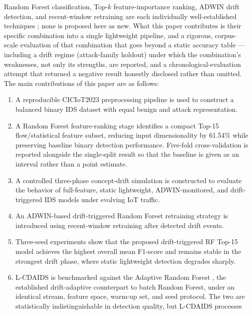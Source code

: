 \documentclass[11pt,a4paper]{article}
\begin{document}
Random Forest classification, Top-$k$ feature-importance ranking, ADWIN
drift detection, and recent-window retraining are each individually
well-established techniques \cite{breiman2001,guyon2003,bifet2007}; none is
proposed here as new. What this paper contributes is their specific
combination into a single lightweight pipeline, and a rigorous,
corpus-scale evaluation of that combination that goes beyond a static
accuracy table --- including a drift regime (attack-family holdout) under
which the combination's weaknesses, not only its strengths, are reported,
and a chronological-evaluation attempt that returned a negative result
honestly disclosed rather than omitted. The main contributions of this
paper are as follows:

\begin{enumerate}
  \item A reproducible CICIoT2023 preprocessing pipeline is used to
        construct a balanced binary IDS dataset with equal benign and
        attack representation.
  \item A Random Forest feature-ranking stage identifies a compact
        Top-15 flow/statistical feature subset, reducing input
        dimensionality by 61.54\% while preserving baseline binary
        detection performance. Five-fold cross-validation is reported
        alongside the single-split result so that the baseline is given
        as an interval rather than a point estimate.
  \item A controlled three-phase concept-drift simulation is constructed
        to evaluate the behavior of full-feature, static lightweight,
        ADWIN-monitored, and drift-triggered IDS models under evolving
        IoT traffic.
  \item An ADWIN-based drift-triggered Random Forest retraining strategy
        is introduced using recent-window retraining after detected
        drift events.
  \item Three-seed experiments show that the proposed drift-triggered RF
        Top-15 model achieves the highest overall mean F1-score and
        remains stable in the strongest drift phase, where static
        lightweight detection degrades sharply.
  \item L-CDAIDS is benchmarked against the Adaptive Random Forest
        \cite{gomes2017}, the established drift-adaptive counterpart to
        batch Random Forest, under an identical stream, feature space,
        warm-up set, and seed protocol. The two are statistically
        indistinguishable in detection quality, but L-CDAIDS processes

\end{enumerate}
\end{document}
